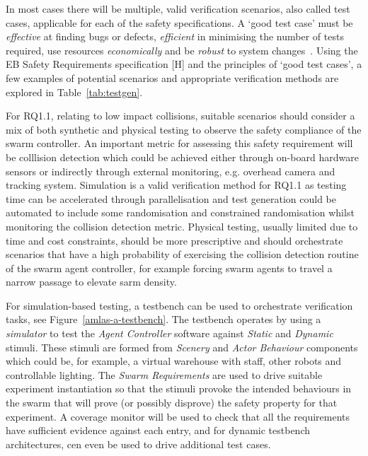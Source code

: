 \documentclass[lettersize,journal]{IEEEtran}
\begin{document}
In most cases there will be multiple, valid verification scenarios, also called test cases, applicable for each of the safety specifications. A `good test case' must be \emph{effective} at finding bugs or defects, \emph{efficient} in minimising the number of tests required, use resources \emph{economically} and be \emph{robust} to system changes~\cite{Fewster1999}. Using the EB Safety Requirements specification [H] and the principles of `good test cases', a few examples of potential scenarios and appropriate verification methods are explored in Table~\ref{tab:testgen}. 

For RQ1.1, relating to low impact collisions, suitable scenarios should consider a mix of both synthetic and physical testing to observe the safety compliance of the swarm controller. An important metric for assessing this safety requirement will be colllision detection which could be achieved either through on-board hardware sensors or indirectly through external monitoring, e.g. overhead camera and tracking system. Simulation is a valid verification method for RQ1.1 as testing time can be accelerated through parallelisation and test generation could be automated to include some randomisation and constrained randomisation whilst monitoring the collision detection metric. Physical testing, usually limited due to time and cost constraints, should be more prescriptive and should orchestrate scenarios that have a high probability of exercising the collision detection routine of the swarm agent controller, for example forcing swarm agents to travel a narrow passage to elevate sarm density. 

For simulation-based testing, a testbench can be used to orchestrate verification tasks, see Figure~\ref{amlas-a-testbench}. The testbench operates by using a \emph{simulator} to test the \emph{Agent Controller} software against \emph{Static} and \emph{Dynamic} stimuli. These stimuli are formed from \emph{Scenery} and \emph{Actor Behaviour} components which could be, for example, a virtual warehouse with staff, other robots and controllable lighting. The \emph{Swarm Requirements} are used to drive suitable experiment instantiation so that the stimuli provoke the intended behaviours in the swarm that will prove (or possibly disprove) the safety property for that experiment. A coverage monitor will be used to check that all the requirements have sufficient evidence against each entry, and for dynamic testbench architectures, cen even be used to drive additional test cases. 
\end{document}
